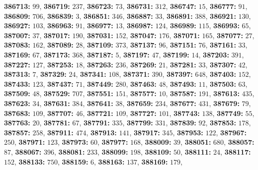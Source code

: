 \textsf{\bfseries 386713:} $99$, \textsf{\bfseries 386719:} $237$, \textsf{\bfseries 386723:} $73$, \textsf{\bfseries 386731:} $312$, \textsf{\bfseries 386747:} $15$, \textsf{\bfseries 386777:} $91$, \textsf{\bfseries 386809:} $706$, \textsf{\bfseries 386839:} $3$, \textsf{\bfseries 386851:} $346$, \textsf{\bfseries 386887:} $33$, \textsf{\bfseries 386891:} $388$, \textsf{\bfseries 386921:} $130$, \textsf{\bfseries 386927:} $103$, \textsf{\bfseries 386963:} $91$, \textsf{\bfseries 386977:} $13$, \textsf{\bfseries 386987:} $124$, \textsf{\bfseries 386989:} $115$, \textsf{\bfseries 386993:} $65$, \textsf{\bfseries 387007:} $37$, \textsf{\bfseries 387017:} $190$, \textsf{\bfseries 387031:} $152$, \textsf{\bfseries 387047:} $176$, \textsf{\bfseries 387071:} $165$, \textsf{\bfseries 387077:} $27$, \textsf{\bfseries 387083:} $162$, \textsf{\bfseries 387089:} $28$, \textsf{\bfseries 387109:} $373$, \textsf{\bfseries 387137:} $96$, \textsf{\bfseries 387151:} $76$, \textsf{\bfseries 387161:} $33$, \textsf{\bfseries 387169:} $67$, \textsf{\bfseries 387173:} $368$, \textsf{\bfseries 387187:} $5$, \textsf{\bfseries 387197:} $47$, \textsf{\bfseries 387199:} $14$, \textsf{\bfseries 387203:} $391$, \textsf{\bfseries 387227:} $127$, \textsf{\bfseries 387253:} $18$, \textsf{\bfseries 387263:} $236$, \textsf{\bfseries 387269:} $21$, \textsf{\bfseries 387281:} $33$, \textsf{\bfseries 387307:} $42$, \textsf{\bfseries 387313:} $7$, \textsf{\bfseries 387329:} $24$, \textsf{\bfseries 387341:} $108$, \textsf{\bfseries 387371:} $390$, \textsf{\bfseries 387397:} $648$, \textsf{\bfseries 387403:} $152$, \textsf{\bfseries 387433:} $123$, \textsf{\bfseries 387437:} $71$, \textsf{\bfseries 387449:} $280$, \textsf{\bfseries 387463:} $48$, \textsf{\bfseries 387493:} $11$, \textsf{\bfseries 387503:} $63$, \textsf{\bfseries 387509:} $48$, \textsf{\bfseries 387529:} $707$, \textsf{\bfseries 387551:} $151$, \textsf{\bfseries 387577:} $10$, \textsf{\bfseries 387587:} $191$, \textsf{\bfseries 387613:} $435$, \textsf{\bfseries 387623:} $34$, \textsf{\bfseries 387631:} $384$, \textsf{\bfseries 387641:} $38$, \textsf{\bfseries 387659:} $234$, \textsf{\bfseries 387677:} $431$, \textsf{\bfseries 387679:} $79$, \textsf{\bfseries 387683:} $109$, \textsf{\bfseries 387707:} $46$, \textsf{\bfseries 387721:} $109$, \textsf{\bfseries 387727:} $101$, \textsf{\bfseries 387743:} $138$, \textsf{\bfseries 387749:} $55$, \textsf{\bfseries 387763:} $20$, \textsf{\bfseries 387781:} $67$, \textsf{\bfseries 387791:} $335$, \textsf{\bfseries 387799:} $331$, \textsf{\bfseries 387839:} $92$, \textsf{\bfseries 387853:} $178$, \textsf{\bfseries 387857:} $258$, \textsf{\bfseries 387911:} $474$, \textsf{\bfseries 387913:} $141$, \textsf{\bfseries 387917:} $345$, \textsf{\bfseries 387953:} $122$, \textsf{\bfseries 387967:} $250$, \textsf{\bfseries 387971:} $123$, \textsf{\bfseries 387973:} $60$, \textsf{\bfseries 387977:} $168$, \textsf{\bfseries 388009:} $39$, \textsf{\bfseries 388051:} $680$, \textsf{\bfseries 388057:} $87$, \textsf{\bfseries 388067:} $396$, \textsf{\bfseries 388081:} $233$, \textsf{\bfseries 388099:} $198$, \textsf{\bfseries 388109:} $50$, \textsf{\bfseries 388111:} $24$, \textsf{\bfseries 388117:} $152$, \textsf{\bfseries 388133:} $750$, \textsf{\bfseries 388159:} $6$, \textsf{\bfseries 388163:} $137$, \textsf{\bfseries 388169:} $179$, 
